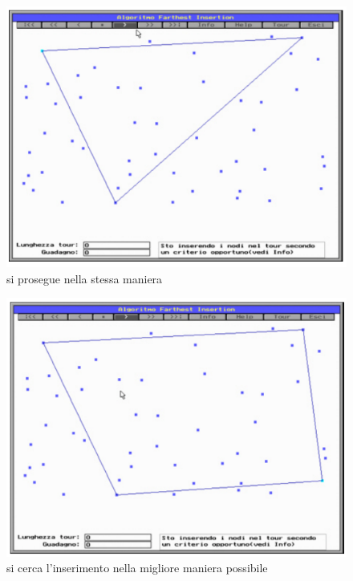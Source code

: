 \documentclass{article}
\begin{document}
\begin{figure}[H]
    \centering
    \includegraphics[scale=0.5]{images/farthest1.png}
    \caption{si prosegue nella stessa maniera}
\end{figure}

\begin{figure}[H]
    \centering
    \includegraphics[scale=0.5]{images/farthest2.png}
    \caption{si cerca l'inserimento nella migliore maniera possibile}
\end{figure}
\end{document}
